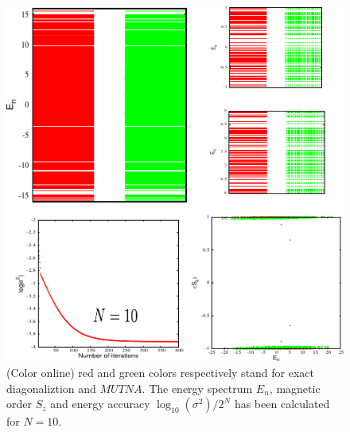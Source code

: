 \documentclass[aps,prb,twocolumn,groupedaddress,notitlepage,showpacs,floatfix,superscriptaddress]{revtex4-1}
\begin{document}
\begin{figure}
\includegraphics[width=1.0 \linewidth]{Data}  
  \caption{(Color online) red and green colors respectively stand for exact diagonaliztion and $MUTNA$. The energy spectrum $E_{n}$, magnetic order $S_{z}$ and energy accuracy $\log_{10}(\sigma^{2})/2^{N}$ has been calculated for $N=10$.     }
  \label{fig:Data}
\end{figure}
\end{document}
